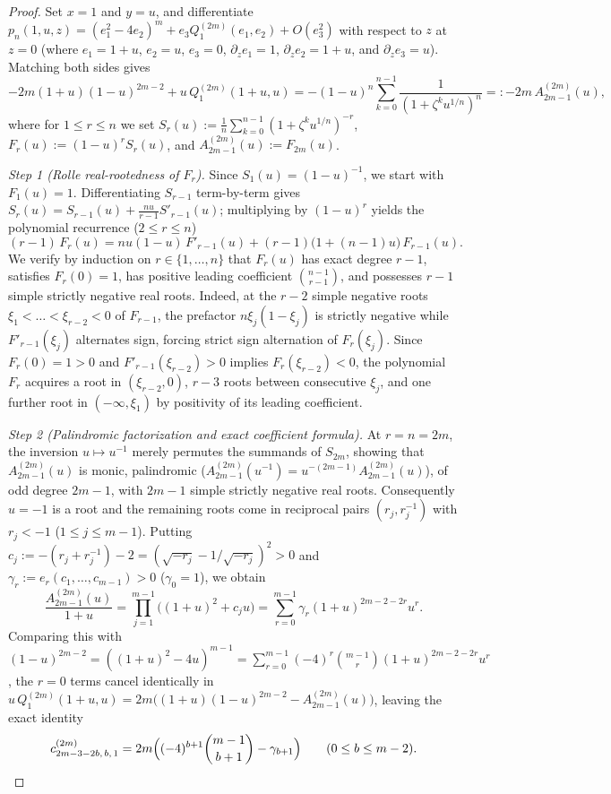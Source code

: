 \documentclass[10pt]{article}
\numberwithin{equation}{section}
\theoremstyle{plain}
\theoremstyle{definition}
\newcommand{\1}{\mathbf{1}}
\begin{document}
\begin{proof}
Set $x = 1$ and $y = u$, and differentiate $p_n(1, u, z) = (e_1^2 - 4e_2)^m + e_3 Q_1^{(2m)}(e_1, e_2) + O(e_3^2)$ with respect to $z$ at $z = 0$ (where $e_1 = 1 + u$, $e_2 = u$, $e_3 = 0$, $\partial_z e_1 = 1$, $\partial_z e_2 = 1 + u$, and $\partial_z e_3 = u$). Matching both sides gives
\[
-2m(1 + u)(1 - u)^{2m - 2} + u\, Q_1^{(2m)}(1 + u, u) = -(1 - u)^n \sum_{k=0}^{n-1} \frac{1}{(1 + \zeta^k u^{1/n})^n} =: -2m\, A_{2m - 1}^{(2m)}(u),
\]
where for $1 \le r \le n$ we set $S_r(u) := \frac{1}{n}\sum_{k=0}^{n-1}(1 + \zeta^k u^{1/n})^{-r}$, $F_r(u) := (1 - u)^r S_r(u)$, and $A_{2m-1}^{(2m)}(u) := F_{2m}(u)$.

\emph{Step 1 (Rolle real-rootedness of $F_r$).} Since $S_1(u) = (1 - u)^{-1}$, we start with $F_1(u) = 1$. Differentiating $S_{r-1}$ term-by-term gives $S_r(u) = S_{r-1}(u) + \frac{nu}{r-1} S'_{r-1}(u)$; multiplying by $(1 - u)^r$ yields the polynomial recurrence ($2 \le r \le n$)
\begin{equation}\label{eq:Fr-rec}
(r - 1)\, F_r(u) = n u(1 - u)\, F'_{r-1}(u) + (r - 1)\bigl(1 + (n - 1)u\bigr)\, F_{r-1}(u).
\end{equation}
We verify by induction on $r \in \{1, \dots, n\}$ that $F_r(u)$ has exact degree $r - 1$, satisfies $F_r(0) = 1$, has positive leading coefficient $\binom{n-1}{r-1}$, and possesses $r - 1$ simple strictly negative real roots. Indeed, at the $r - 2$ simple negative roots $\xi_1 < \dots < \xi_{r-2} < 0$ of $F_{r-1}$, the prefactor $n\xi_j(1 - \xi_j)$ is strictly negative while $F'_{r-1}(\xi_j)$ alternates sign, forcing strict sign alternation of $F_r(\xi_j)$. Since $F_r(0) = 1 > 0$ and $F'_{r-1}(\xi_{r-2}) > 0$ implies $F_r(\xi_{r-2}) < 0$, the polynomial $F_r$ acquires a root in $(\xi_{r-2}, 0)$, $r - 3$ roots between consecutive $\xi_j$, and one further root in $(-\infty, \xi_1)$ by positivity of its leading coefficient.

\emph{Step 2 (Palindromic factorization and exact coefficient formula).} At $r = n = 2m$, the inversion $u \mapsto u^{-1}$ merely permutes the summands of $S_{2m}$, showing that $A_{2m-1}^{(2m)}(u)$ is monic, palindromic ($A_{2m-1}^{(2m)}(u^{-1}) = u^{-(2m-1)} A_{2m-1}^{(2m)}(u)$), of odd degree $2m - 1$, with $2m - 1$ simple strictly negative real roots. Consequently $u = -1$ is a root and the remaining roots come in reciprocal pairs $(r_j, r_j^{-1})$ with $r_j < -1$ ($1 \le j \le m - 1$). Putting $c_j := -(r_j + r_j^{-1}) - 2 = (\sqrt{-r_j} - 1/\sqrt{-r_j})^2 > 0$ and $\gamma_r := e_r(c_1, \dots, c_{m-1}) > 0$ ($\gamma_0 = 1$), we obtain
\[
\frac{A_{2m-1}^{(2m)}(u)}{1 + u} = \prod_{j=1}^{m-1}\bigl((1 + u)^2 + c_j u\bigr) = \sum_{r=0}^{m-1} \gamma_r (1 + u)^{2m - 2 - 2r} u^r.
\]
Comparing this with $(1 - u)^{2m-2} = ((1 + u)^2 - 4u)^{m-1} = \sum_{r=0}^{m-1} (-4)^r \binom{m-1}{r}(1 + u)^{2m-2-2r} u^r$, the $r = 0$ terms cancel identically in $u\, Q_1^{(2m)}(1 + u, u) = 2m\bigl((1 + u)(1 - u)^{2m - 2} - A_{2m-1}^{(2m)}(u)\bigr)$, leaving the exact identity
\begin{equation}\label{eq:c1-exact}
c_{2m - 3 - 2b,\, b,\, 1}^{(2m)} = 2m\Bigl((-4)^{b+1}\binom{m - 1}{b + 1} - \gamma_{b+1}\Bigr) \qquad (0 \le b \le m - 2).
\end{equation}


\end{proof}
\end{document}
